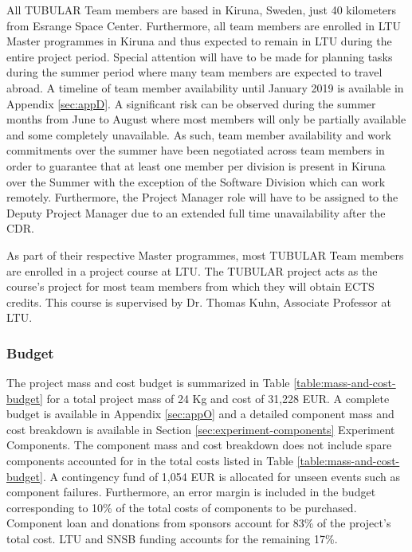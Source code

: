 \documentclass[a4paper,12pt,twoside]{article}
\begin{document}
All TUBULAR Team members are based in Kiruna, Sweden, just 40 kilometers from Esrange Space Center. Furthermore, all team members are enrolled in LTU Master programmes in Kiruna and thus expected to remain in LTU during the entire project period. Special attention will have to be made for planning tasks during the summer period where many team members are expected to travel abroad. A timeline of team member availability  until January 2019 is available in Appendix \ref{sec:appD}. A significant risk can be observed during the summer months from June to August where most members will only be partially available and some completely unavailable. As such, team member availability and work commitments over the summer have been negotiated across team members in order to guarantee that at least one member per division is present in Kiruna over the Summer with the exception of the Software Division which can work remotely. Furthermore, the Project Manager role will have to be assigned to the Deputy Project Manager due to an extended full time unavailability after the CDR.

As part of their respective Master programmes, most TUBULAR Team members are enrolled in a project course at LTU. The TUBULAR project acts as the course's project for most team members from which they will obtain ECTS credits. This course is supervised by Dr. Thomas Kuhn, Associate Professor at LTU.

\pagebreak
\subsubsection{Budget}
\label{sec:3.2.2}
The project mass and cost budget is summarized in Table \ref{table:mass-and-cost-budget} for a total project mass of 24 Kg and cost of 31,228 EUR. A complete budget is available in Appendix \ref{sec:appO} and a detailed component mass and cost breakdown is available in Section \ref{sec:experiment-components} Experiment Components. The component mass and cost breakdown does not include spare components accounted for in the total costs listed in Table \ref{table:mass-and-cost-budget}. A contingency fund of 1,054 EUR is allocated for unseen events such as component failures. Furthermore, an error margin is included in the budget corresponding to 10\% of the total costs of components to be purchased. Component loan and donations from sponsors account for 83\% of the project's total cost. LTU and SNSB funding accounts for the remaining 17\%. 


\end{document}
